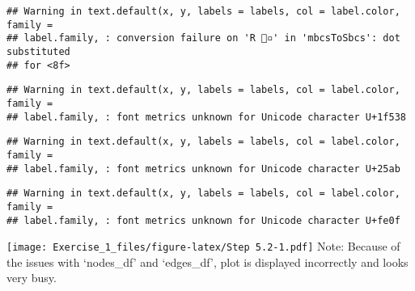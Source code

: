 \documentclass[
]{article}
\begin{document}
\begin{verbatim}
## Warning in text.default(x, y, labels = labels, col = label.color, family =
## label.family, : conversion failure on 'R 🔸▫️' in 'mbcsToSbcs': dot substituted
## for <8f>
\end{verbatim}

\begin{verbatim}
## Warning in text.default(x, y, labels = labels, col = label.color, family =
## label.family, : font metrics unknown for Unicode character U+1f538
\end{verbatim}

\begin{verbatim}
## Warning in text.default(x, y, labels = labels, col = label.color, family =
## label.family, : font metrics unknown for Unicode character U+25ab
\end{verbatim}

\begin{verbatim}
## Warning in text.default(x, y, labels = labels, col = label.color, family =
## label.family, : font metrics unknown for Unicode character U+fe0f
\end{verbatim}

\texttt{[image: Exercise\_1\_files/figure-latex/Step 5.2-1.pdf]} Note:
Because of the issues with `nodes\_df' and `edges\_df', plot is
displayed incorrectly and looks very busy.
\end{document}
